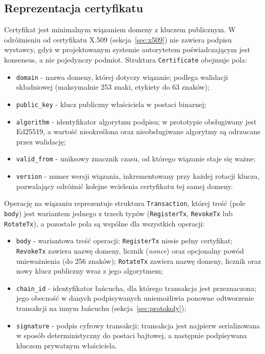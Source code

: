 \subsection{Reprezentacja certyfikatu}
\label{subsec:reprezentacja-cert}

Certyfikat jest minimalnym wiązaniem domeny z kluczem publicznym. W odróżnieniu od certyfikatu X.509 (sekcja~\ref{sec:x509}) nie zawiera podpisu wystawcy, gdyż w projektowanym systemie autorytetem poświadczającym jest konsensus, a nie pojedynczy podmiot. Struktura \texttt{Certificate} obejmuje pola:
\begin{itemize}
    \item \texttt{domain} - nazwa domeny, której dotyczy wiązanie; podlega walidacji składniowej (maksymalnie 253 znaki, etykiety do 63 znaków);
    \item \texttt{public\_key} - klucz publiczny właściciela w postaci binarnej;
    \item \texttt{algorithm} - identyfikator algorytmu podpisu; w prototypie obsługiwany jest Ed25519, a wartość nieokreślona oraz nieobsługiwane algorytmy są odrzucane przez walidację;
    \item \texttt{valid\_from} - uniksowy znacznik czasu, od którego wiązanie staje się ważne;
    \item \texttt{version} - numer wersji wiązania, inkrementowany przy każdej rotacji klucza, pozwalający odróżnić kolejne wcielenia certyfikatu tej samej domeny.
\end{itemize}

Operację na wiązaniu reprezentuje struktura \texttt{Transaction}, której treść (pole \texttt{body}) jest wariantem jednego z trzech typów (\texttt{RegisterTx}, \texttt{RevokeTx} lub \texttt{RotateTx}), a pozostałe pola są wspólne dla wszystkich operacji:
\begin{itemize}
    \item \texttt{body} - wariantowa treść operacji: \texttt{RegisterTx} niesie pełny certyfikat; \texttt{RevokeTx} zawiera nazwę domeny, licznik (\emph{nonce}) oraz opcjonalny powód unieważnienia (do 256 znaków); \texttt{RotateTx} zawiera nazwę domeny, licznik oraz nowy klucz publiczny wraz z jego algorytmem;
    \item \texttt{chain\_id} - identyfikator łańcucha, dla którego transakcja jest przeznaczona; jego obecność w danych podpisywanych uniemożliwia ponowne odtworzenie transakcji na innym łańcuchu (sekcja~\ref{sec:protokoly});
    \item \texttt{signature} - podpis cyfrowy transakcji; transakcja jest najpierw serializowana w sposób deterministyczny do postaci bajtowej, a następnie podpisywana kluczem prywatnym właściciela.
\end{itemize}

